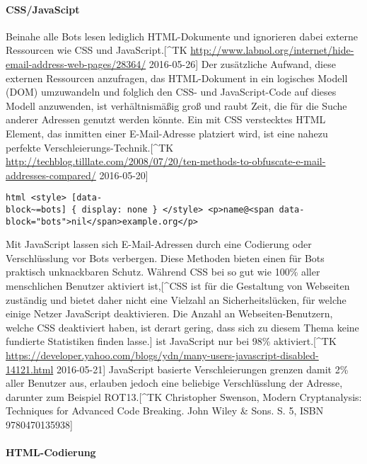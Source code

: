 \paragraph{CSS/JavaScipt}
\label{par:cssjavascipt}

Beinahe alle Bots lesen lediglich HTML-Dokumente und ignorieren dabei
externe Ressourcen wie CSS und JavaScript.{[}\^{}TK
\url{http://www.labnol.org/internet/hide-email-address-web-pages/28364/}
2016-05-26{]} Der zusätzliche Aufwand, diese externen Ressourcen
anzufragen, das HTML-Dokument in ein logisches Modell (DOM) umzuwandeln
und folglich den CSS- und JavaScript-Code auf dieses Modell anzuwenden,
ist verhältnismäßig groß und raubt Zeit, die für die Suche anderer
Adressen genutzt werden könnte. Ein mit CSS verstecktes HTML Element,
das inmitten einer E-Mail-Adresse platziert wird, ist eine nahezu
perfekte Verschleierungs-Technik.{[}\^{}TK
\url{http://techblog.tilllate.com/2008/07/20/ten-methods-to-obfuscate-e-mail-addresses-compared/}
2016-05-20{]}

\texttt{html\ \textless{}style\textgreater{}\ {[}data-block\textasciitilde{}=bots{]}\ \{\ display:\ none\ \}\ \textless{}/style\textgreater{}\ \textless{}p\textgreater{}name@\textless{}span\ data-block="bots"\textgreater{}nil\textless{}/span\textgreater{}example.org\textless{}/p\textgreater{}}

Mit JavaScript lassen sich E-Mail-Adressen durch eine Codierung oder
Verschlüsslung vor Bots verbergen. Diese Methoden bieten einen für Bots
praktisch unknackbaren Schutz. Während CSS bei so gut wie 100\% aller
menschlichen Benutzer aktiviert ist,{[}\^{}CSS ist für die Gestaltung
von Webseiten zuständig und bietet daher nicht eine Vielzahl an
Sicherheitslücken, für welche einige Netzer JavaScript deaktivieren. Die
Anzahl an Webseiten-Benutzern, welche CSS deaktiviert haben, ist derart
gering, dass sich zu diesem Thema keine fundierte Statistiken finden
lasse.{]} ist JavaScript nur bei 98\% aktiviert.{[}\^{}TK
\url{https://developer.yahoo.com/blogs/ydn/many-users-javascript-disabled-14121.html}
2016-05-21{]} JavaScript basierte Verschleierungen grenzen damit 2\%
aller Benutzer aus, erlauben jedoch eine beliebige Verschlüsslung der
Adresse, darunter zum Beispiel ROT13.{[}\^{}TK Christopher Swenson,
Modern Cryptanalysis: Techniques for Advanced Code Breaking. John Wiley
\& Sons. S. 5, ISBN 9780470135938{]}

\paragraph{HTML-Codierung}
\label{par:html-codierung}

